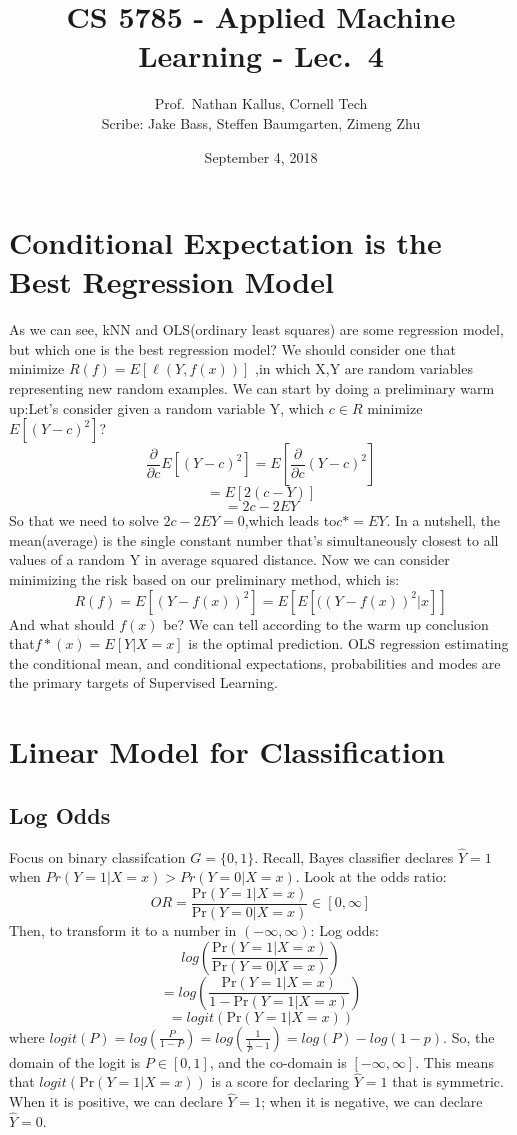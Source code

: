 \documentclass[a4paper]{article}
\title{CS 5785 - Applied Machine Learning - Lec.\ 4}
\author{Prof.\ Nathan Kallus, Cornell Tech\\Scribe: Jake Bass, Steffen Baumgarten, Zimeng Zhu}
\date{September 4, 2018}
\begin{document}
\maketitle
\section{Conditional Expectation is the Best Regression Model}
As we can see, kNN and OLS(ordinary least squares) are some regression model, but which one is the best regression model? We should consider one that minimize $R(f)=E[\ell(Y,f(x))]$ ,in which X,Y are random variables representing new random examples.\newline
We can start by doing a preliminary warm up:Let's consider given a random variable Y, which $c\in R$ minimize $E[(Y-c)^2]$?\newline
$$\frac{\partial}{\partial c}E[(Y-c)^2]=E[\frac{\partial}{\partial c}(Y-c)^2]$$
$$=E[2(c-Y)]$$
$$=2c-2EY$$
So that we need to solve $2c-2EY=0$,which leads to$c*=EY$.
In a nutshell, the mean(average) is the single constant number that's simultaneously closest to all values of a random Y in average squared distance.\newline
Now we can consider minimizing the risk based on our preliminary method, which is:\newline
$$R(f)=E[(Y-f(x))^2]=E[E[((Y-f(x))^2|x]]$$\newline
And what should $f(x)$ be? We can tell according to the warm up conclusion that$f*(x)=E[Y|X=x]$ is the optimal prediction.\newline
OLS regression estimating the conditional mean, and conditional expectations, probabilities and modes are the primary targets of Supervised Learning.


\section{Linear Model for Classification}
\subsection{Log Odds}
Focus on binary classifcation $G=\{0,1\}$. \newline
Recall, Bayes classifier declares $\hat{Y}=1$ when $Pr(Y=1|X=x) > Pr(Y=0|X=x)$. \newline
Look at the odds ratio: \newline
$$OR = \frac{\text{Pr}(Y=1|X=x)}{\text{Pr}(Y=0|X=x)} \in [0, \infty]$$ \newline
Then, to transform it to a number in $(-\infty, \infty)$: \newline
Log odds: 
$$log(\frac{\text{Pr}(Y=1|X=x)}{\text{Pr}(Y=0|X=x)})$$
$$ = log(\frac{\text{Pr}(Y=1|X=x)}{1 - \text{Pr}(Y=1|X=x)})$$
$$ = logit(\text{Pr}(Y=1|X=x)) $$
where $logit(P) = log(\frac{P}{1-P}) = log(\frac{1}{\frac{1}{P} - 1}) = log(P) - log(1-p)$. \newline
So, the domain of the logit is $P \in [0,1]$, and the co-domain is $[-\infty, \infty]$. \newline
This means that $logit(\text{Pr}(Y=1|X=x))$ is a score for declaring $\hat{Y}=1$ that is symmetric. When it is positive, we can declare $\hat{Y}=1$; when it is negative, we can declare $\hat{Y}=0$.
\end{document}
